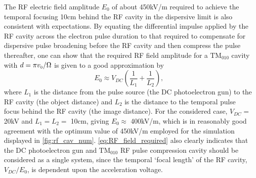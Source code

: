 The RF electric field amplitude $E_{0}$ of about 450kV/m required to achieve the temporal focusing 10cm behind the RF cavity in the dispersive limit is also consistent with expectations.
By equating the differential impulse applied by the RF cavity across the electron pulse duration to that required to compensate for dispersive pulse broadening before the RF cavity and then compress the pulse thereafter, one can show that the required RF field amplitude for a $\text{TM}_{010}$ cavity with $ d = \pi v_{{\scriptscriptstyle 0}} / \Omega $ is given to a good approximation by
\begin{equation} \label{eq:RF_field_required}
  E_{0} \approx V_{DC} \left ( \frac{1}{ L_{1} } + \frac{1}{ L_{2} } \right ) \text{,}
\end{equation}
where $L_{1}$ is the distance from the pulse source (the DC photoelectron gun) to the RF cavity (the object distance) and $L_{2}$ is the distance to the temporal pulse focus behind the RF cavity (the image distance).
For the considered case, $V_{DC} = $ 20kV and $ L_{1} = L_{2} = $ 10cm, giving $ E_{0} \approx $ 400kV/m, which is in reasonably good agreement with the optimum value of 450kV/m employed for the simulation displayed in \ref{fig:rf_cav_num}.
\ref{eq:RF_field_required} also clearly indicates that the DC photoelectron gun and $\text{TM}_{010}$ RF pulse compression cavity should be considered as a single system, since the temporal `focal length' of the RF cavity, $ V_{DC} / E_{0} $, is dependent upon the acceleration voltage.

